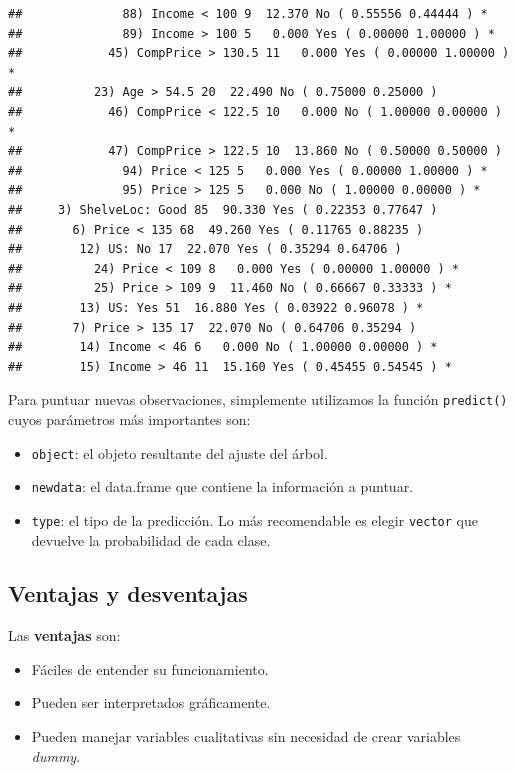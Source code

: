\documentclass[]{book}
\providecommand{\tightlist}{%
  \setlength{\itemsep}{0pt}\setlength{\parskip}{0pt}}
\begin{document}
\begin{verbatim}
##              88) Income < 100 9  12.370 No ( 0.55556 0.44444 ) *
##              89) Income > 100 5   0.000 Yes ( 0.00000 1.00000 ) *
##            45) CompPrice > 130.5 11   0.000 Yes ( 0.00000 1.00000 ) *
##          23) Age > 54.5 20  22.490 No ( 0.75000 0.25000 )  
##            46) CompPrice < 122.5 10   0.000 No ( 1.00000 0.00000 ) *
##            47) CompPrice > 122.5 10  13.860 No ( 0.50000 0.50000 )  
##              94) Price < 125 5   0.000 Yes ( 0.00000 1.00000 ) *
##              95) Price > 125 5   0.000 No ( 1.00000 0.00000 ) *
##     3) ShelveLoc: Good 85  90.330 Yes ( 0.22353 0.77647 )  
##       6) Price < 135 68  49.260 Yes ( 0.11765 0.88235 )  
##        12) US: No 17  22.070 Yes ( 0.35294 0.64706 )  
##          24) Price < 109 8   0.000 Yes ( 0.00000 1.00000 ) *
##          25) Price > 109 9  11.460 No ( 0.66667 0.33333 ) *
##        13) US: Yes 51  16.880 Yes ( 0.03922 0.96078 ) *
##       7) Price > 135 17  22.070 No ( 0.64706 0.35294 )  
##        14) Income < 46 6   0.000 No ( 1.00000 0.00000 ) *
##        15) Income > 46 11  15.160 Yes ( 0.45455 0.54545 ) *
\end{verbatim}

Para puntuar nuevas observaciones, simplemente utilizamos la función \texttt{predict()} cuyos parámetros más importantes son:

\begin{itemize}
\tightlist
\item
  \texttt{object}: el objeto resultante del ajuste del árbol.
\item
  \texttt{newdata}: el data.frame que contiene la información a puntuar.
\item
  \texttt{type}: el tipo de la predicción. Lo más recomendable es elegir \texttt{vector} que devuelve la probabilidad de cada clase.
\end{itemize}

\hypertarget{ventajas-y-desventajas}{%
\subsection{Ventajas y desventajas}\label{ventajas-y-desventajas}}

Las \textbf{ventajas} son:

\begin{itemize}
\tightlist
\item
  Fáciles de entender su funcionamiento.
\item
  Pueden ser interpretados gráficamente.
\item
  Pueden manejar variables cualitativas sin necesidad de crear variables \emph{dummy}.
\end{itemize}
\end{document}
